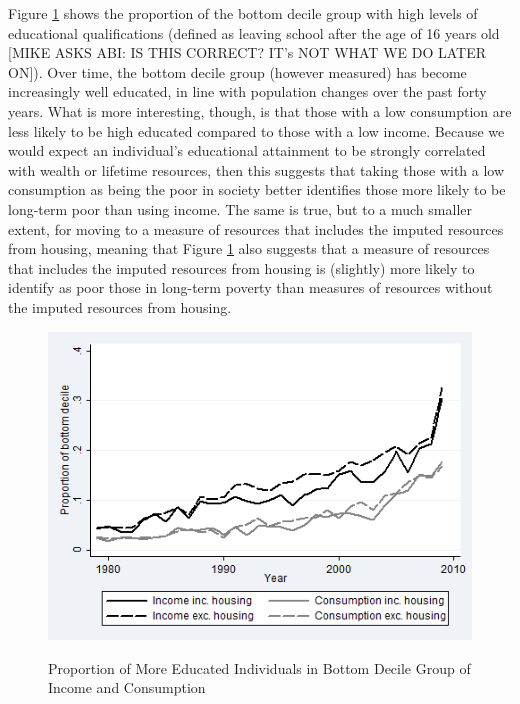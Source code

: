 Figure \ref{fig:pov_comp} shows the proportion of the bottom decile group with high levels of educational qualifications (defined as leaving school after the age of 16 years old [MIKE ASKS ABI: IS THIS CORRECT? IT's NOT WHAT WE DO LATER ON]). Over time, the bottom decile group (however measured) has become increasingly well educated, in line with population changes over the past forty years. What is more interesting, though, is that those with a low consumption are less likely to be high educated compared to those with a low income. Because we would expect an individual's educational attainment to be strongly correlated with wealth or lifetime resources, then this suggests that taking those with a low consumption as being the poor in society better identifies those more likely to be long-term poor than using income. The same is true, but to a much smaller extent, for moving to a measure of resources that includes the imputed resources from housing, meaning that Figure \ref{fig:pov_comp} also suggests that a measure of resources that includes the imputed resources from housing is (slightly) more likely to identify as poor those in long-term poverty than measures of resources without the imputed resources from housing.

\begin{figure}
\caption{Proportion of More Educated Individuals in Bottom Decile Group of Income and Consumption}
\centering
\includegraphics[width=.7\linewidth]{pictures/dec_comp4.png}
\label{fig:pov_comp}
\end{figure}

